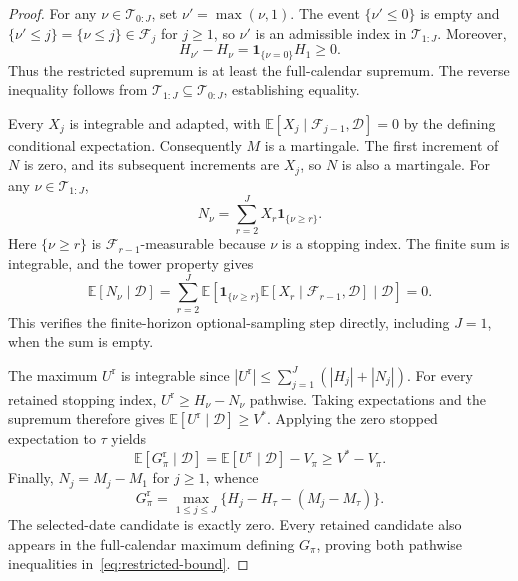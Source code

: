 \documentclass[11pt]{article}
\newcommand{\E}{\mathbb E}
\newcommand{\F}{\mathcal F}
\begin{document}
\begin{proof}
For any $\nu\in\mathcal T_{0:J}$, set $\nu'=\max(\nu,1)$. The event $\{\nu'\leq0\}$ is empty and $\{\nu'\leq j\}=\{\nu\leq j\}\in\F_j$ for $j\geq1$, so $\nu'$ is an admissible index in $\mathcal T_{1:J}$. Moreover,
\begin{equation}
 H_{\nu'}-H_\nu=\mathbf1_{\{\nu=0\}}H_1\geq0.
\label{eq:initial-right-payoff-improvement}
\end{equation}
Thus the restricted supremum is at least the full-calendar supremum. The reverse inequality follows from $\mathcal T_{1:J}\subseteq\mathcal T_{0:J}$, establishing equality.

Every $X_j$ is integrable and adapted, with $\E[X_j\mid\F_{j-1},\mathcal D]=0$ by the defining conditional expectation. Consequently $M$ is a martingale. The first increment of $N$ is zero, and its subsequent increments are $X_j$, so $N$ is also a martingale. For any $\nu\in\mathcal T_{1:J}$,
\begin{equation}
 N_\nu=\sum_{r=2}^JX_r\mathbf1_{\{\nu\geq r\}}.
\label{eq:restricted-stopped-martingale}
\end{equation}
Here $\{\nu\geq r\}$ is $\F_{r-1}$-measurable because $\nu$ is a stopping index. The finite sum is integrable, and the tower property gives
\begin{equation}
 \E[N_\nu\mid\mathcal D]
 =\sum_{r=2}^J\E\!\left[
 \mathbf1_{\{\nu\geq r\}}
 \E[X_r\mid\F_{r-1},\mathcal D]\mid\mathcal D\right]=0.
\label{eq:restricted-optional-sampling}
\end{equation}
This verifies the finite-horizon optional-sampling step directly, including $J=1$, when the sum is empty.

The maximum $U^{\mathrm r}$ is integrable since
$|U^{\mathrm r}|\leq\sum_{j=1}^J(|H_j|+|N_j|)$.
For every retained stopping index, $U^{\mathrm r}\geq H_\nu-N_\nu$ pathwise. Taking expectations and the supremum therefore gives $\E[U^{\mathrm r}\mid\mathcal D]\geq V^*$. Applying the zero stopped expectation to $\tau$ yields
\begin{equation}
 \E[G^{\mathrm r}_\pi\mid\mathcal D]
 =\E[U^{\mathrm r}\mid\mathcal D]-V_\pi\geq V^*-V_\pi.
\label{eq:restricted-expected-gain}
\end{equation}
Finally, $N_j=M_j-M_1$ for $j\geq1$, whence
\begin{equation}
 G^{\mathrm r}_\pi
 =\max_{1\leq j\leq J}\{H_j-H_\tau-(M_j-M_\tau)\}.
\label{eq:restricted-shared-shift}
\end{equation}
The selected-date candidate is exactly zero. Every retained candidate also appears in the full-calendar maximum defining $G_\pi$, proving both pathwise inequalities in~\eqref{eq:restricted-bound}.
\end{proof}
\end{document}
